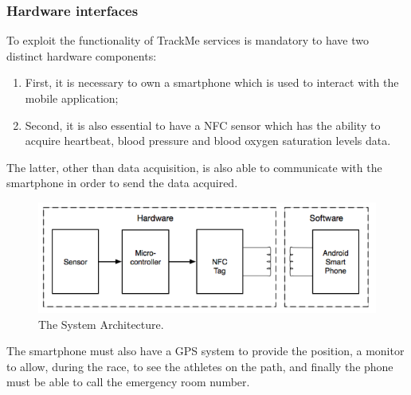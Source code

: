 \subsubsection{Hardware interfaces}
To exploit the functionality of TrackMe services is mandatory to have two distinct hardware components:
\begin{enumerate}
\item First, it is necessary to own a smartphone which is used to interact with the mobile application;
\item Second, it is also essential to have a NFC sensor which has the ability to acquire heartbeat, blood pressure and blood oxygen saturation levels data.
\end{enumerate}
The latter, other than data acquisition, is also able to communicate with the smartphone in order to send the data acquired.\\
\begin{figure}[h!]
  \includegraphics[width=\linewidth]{Images/hardware}
  \caption{The System Architecture.}
  \label{fig:The System Architecture}
\end{figure} 
The smartphone must also have a GPS system to provide the position, a monitor to allow, during the race, to see the athletes on the path, and finally the phone must be able to call the emergency room number.

